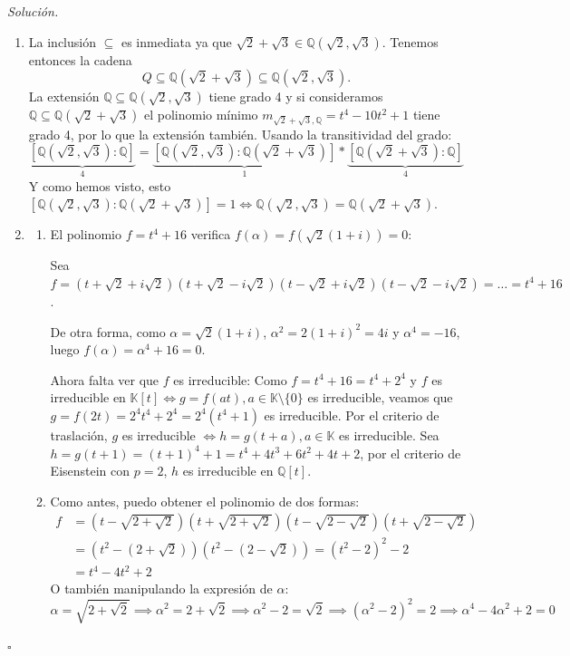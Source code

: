\documentclass[10pt, spanish]{report}
\theoremstyle{definition}
\newenvironment{sol}{\textit{Solución.}}{\hfill$\square$}
\newcommand{\Q}{\mathbb{Q}}
\newcommand{\K}{\mathbb{K}}
\newcommand{\fecha}[1]{\marginpar{\underline{#1}}}
\begin{document}
\fecha{25/02}
\begin{sol}
    \begin{enumerate}
        \item La inclusión $\subseteq$ es inmediata ya que $\sqrt{2}+\sqrt{3}\in
            \Q(\sqrt{2},\sqrt{3})$. Tenemos entonces la cadena
            \[Q\subseteq\Q(\sqrt{2}+\sqrt{3})\subseteq\Q(\sqrt{2},\sqrt{3}).\]
            La extensión $\Q\subseteq\Q(\sqrt{2},\sqrt{3})$ tiene grado 4 y si
            consideramos $\Q\subseteq\Q(\sqrt{2}+\sqrt{3})$ el polinomio mínimo
            $m_{\sqrt{2}+\sqrt{3},\Q}=t^4-10t^2+1$ tiene grado 4, por lo que la
            extensión también. Usando la transitividad del grado:
            \[\underbrace{[\Q(\sqrt{2},\sqrt{3}):\Q]}_{4}=
                \underbrace{[\Q(\sqrt{2},\sqrt{3}):\Q(\sqrt{2}+\sqrt{3})]}_{1}*
                \underbrace{[\Q(\sqrt{2}+\sqrt{3}):\Q]}_{4}\]
                Y como hemos visto, esto
                $[\Q(\sqrt{2},\sqrt{3}):\Q(\sqrt{2}+\sqrt{3})]=1\Leftrightarrow
                \Q(\sqrt{2},\sqrt{3})=\Q(\sqrt{2}+\sqrt{3})$.
        \item
            \begin{enumerate}
                \item El polinomio $f=t^4+16$ verifica $f(\alpha)=
                    f(\sqrt{2}(1+i))=0$:

                    Sea $f=(t+\sqrt{2}+i\sqrt{2})(t+\sqrt{2}-i\sqrt{2})
                    (t-\sqrt{2}+i\sqrt{2})(t-\sqrt{2}-i\sqrt{2})=\ldots=t^4+16$.

                    De otra forma, como $\alpha=\sqrt{2}(1+i)$,
                    $\alpha^2=2(1+i)^2=4i$ y $\alpha^4=-16$, luego
                    $f(\alpha)=\alpha^4+16=0$.

                    Ahora falta ver que $f$ es irreducible:
                    Como $f=t^4+16=t^4+2^4$ y $f$ es irreducible en $\K[t]
                    \Leftrightarrow g=f(at), a\in \K\setminus\{0\}$ es
                    irreducible, veamos que $g=f(2t)=2^4t^4+2^4=2^4(t^4+1)$ es
                    irreducible. Por el criterio de traslación, $g$ es
                    irreducible $\Leftrightarrow h=g(t+a), a\in\K$ es
                    irreducible. Sea $h=g(t+1)=(t+1)^4+1=t^4+4t^3+6t^2+4t+2$,
                    por el criterio de Eisenstein con $p=2$, $h$ es irreducible
                    en $\Q[t]$.
                \item Como antes, puedo obtener el polinomio de dos formas:
                    \begin{align*}
                        f&=(t-\sqrt{2+\sqrt{2}})(t+\sqrt{2+\sqrt{2}})
                        (t-\sqrt{2-\sqrt{2}})(t+\sqrt{2-\sqrt{2}})\\
                         &=(t^2-(2+\sqrt{2}))(t^2-(2-\sqrt{2}))=(t^2-2)^2-2\\
                         &=t^4-4t^2+2
                    \end{align*}
                    O también manipulando la expresión de $\alpha$:
                    \[\alpha=\sqrt{2+\sqrt{2}}\implies\alpha^2=2+\sqrt{2}
                     \implies\alpha^2-2=\sqrt{2}\implies(\alpha^2-2)^2=2\implies
                     \alpha^4-4\alpha^2+2=0\]


\end{enumerate}
\end{enumerate}
\end{sol}
\end{document}
